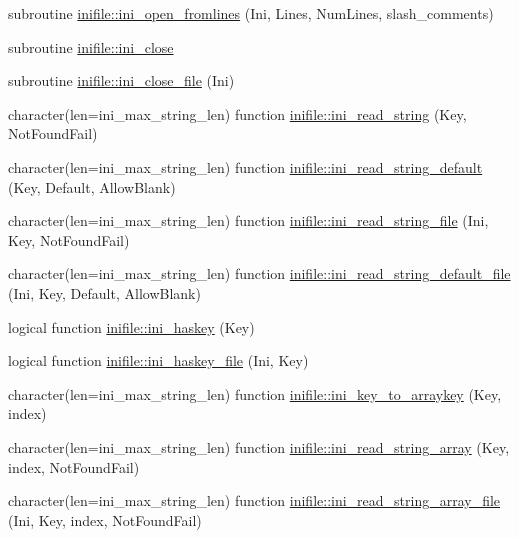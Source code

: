 \begin{DoxyCompactItemize}
\item 
subroutine \mbox{\hyperlink{namespaceinifile_aaece0286cd984aadae94bf1212d74f9f}{inifile\+::ini\+\_\+open\+\_\+fromlines}} (Ini, Lines, Num\+Lines, slash\+\_\+comments)
\item 
subroutine \mbox{\hyperlink{namespaceinifile_a78d82ad0d3252c4a2d546ee63b37b9b4}{inifile\+::ini\+\_\+close}}
\item 
subroutine \mbox{\hyperlink{namespaceinifile_a3e8c87d124e33f36146deccd416a2cc1}{inifile\+::ini\+\_\+close\+\_\+file}} (Ini)
\item 
character(len=ini\+\_\+max\+\_\+string\+\_\+len) function \mbox{\hyperlink{namespaceinifile_a3e13a763ec2647b0a011c509a529ffbf}{inifile\+::ini\+\_\+read\+\_\+string}} (Key, Not\+Found\+Fail)
\item 
character(len=ini\+\_\+max\+\_\+string\+\_\+len) function \mbox{\hyperlink{namespaceinifile_aa7ae8cf26934154dd70639ba1ed9d541}{inifile\+::ini\+\_\+read\+\_\+string\+\_\+default}} (Key, Default, Allow\+Blank)
\item 
character(len=ini\+\_\+max\+\_\+string\+\_\+len) function \mbox{\hyperlink{namespaceinifile_a83d64e9da5ab1119c623d180ebefa77f}{inifile\+::ini\+\_\+read\+\_\+string\+\_\+file}} (Ini, Key, Not\+Found\+Fail)
\item 
character(len=ini\+\_\+max\+\_\+string\+\_\+len) function \mbox{\hyperlink{namespaceinifile_a7af43d0285b9f48d8082252153920a68}{inifile\+::ini\+\_\+read\+\_\+string\+\_\+default\+\_\+file}} (Ini, Key, Default, Allow\+Blank)
\item 
logical function \mbox{\hyperlink{namespaceinifile_a72c6fee616d03391492c7f2722f12ca8}{inifile\+::ini\+\_\+haskey}} (Key)
\item 
logical function \mbox{\hyperlink{namespaceinifile_afa65465f4a06b9d51b12e74038f77132}{inifile\+::ini\+\_\+haskey\+\_\+file}} (Ini, Key)
\item 
character(len=ini\+\_\+max\+\_\+string\+\_\+len) function \mbox{\hyperlink{namespaceinifile_a41a20dc9e9ec4315613c4e3c23108f2e}{inifile\+::ini\+\_\+key\+\_\+to\+\_\+arraykey}} (Key, index)
\item 
character(len=ini\+\_\+max\+\_\+string\+\_\+len) function \mbox{\hyperlink{namespaceinifile_af85df5c619b25702ba2acfebf00f3c60}{inifile\+::ini\+\_\+read\+\_\+string\+\_\+array}} (Key, index, Not\+Found\+Fail)
\item 
character(len=ini\+\_\+max\+\_\+string\+\_\+len) function \mbox{\hyperlink{namespaceinifile_a99383bb07cc01af1876a178e4c55a8e5}{inifile\+::ini\+\_\+read\+\_\+string\+\_\+array\+\_\+file}} (Ini, Key, index, Not\+Found\+Fail)

\end{DoxyCompactItemize}
